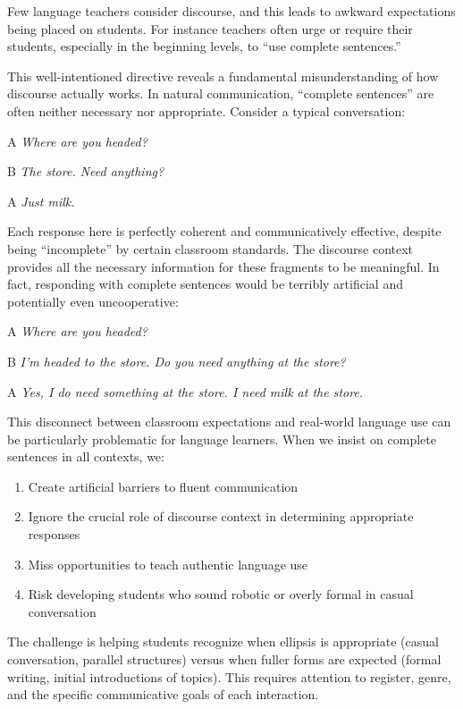 \begin{tcolorbox}[title=``Use complete sentences'', colback=white, colframe=blue!75!black, fonttitle=\bfseries]\label{sec:complete-sentences}
Few language teachers consider discourse, and this leads to awkward expectations being placed on students. For instance teachers often urge or require their students, especially in the beginning levels, to ``use complete sentences.''

\phantom{~~~~}This well-intentioned directive reveals a fundamental misunderstanding of how discourse actually works. In natural communication, ``complete sentences'' are often neither necessary nor appropriate. Consider a typical conversation:

\begin{dialogue}
   \item[A] \textit{Where are you headed?}
   \item[B] \textit{The store. Need anything?}
   \item[A] \textit{Just milk.}
\end{dialogue}

Each response here is perfectly coherent and communicatively effective, despite being ``incomplete'' by certain classroom standards. The discourse context provides all the necessary information for these fragments to be meaningful. In fact, responding with complete sentences would be terribly artificial and potentially even uncooperative:

\begin{dialogue}
   \item[A] \textit{Where are you headed?}
   \item[B] \textit{I'm headed to the store. Do you need anything at the store?}
   \item[A] \textit{Yes, I do need something at the store. I need milk at the store.}
\end{dialogue}

This disconnect between classroom expectations and real-world language use can be particularly problematic for language learners. When we insist on complete sentences in all contexts, we:

\begin{enumerate}[noitemsep]
   \item Create artificial barriers to fluent communication
   \item Ignore the crucial role of discourse context in determining appropriate responses
   \item Miss opportunities to teach authentic language use
   \item Risk developing students who sound robotic or overly formal in casual conversation
\end{enumerate}

The challenge is helping students recognize when ellipsis is appropriate (casual conversation, parallel structures) versus when fuller forms are expected (formal writing, initial introductions of topics). This requires attention to register, genre, and the specific communicative goals of each interaction.
\end{tcolorbox}


